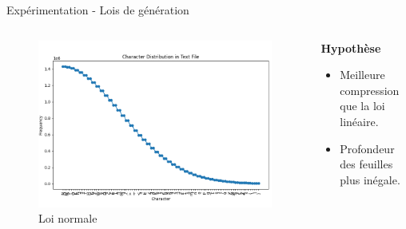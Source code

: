 \documentclass{beamer}
\begin{document}
\begin{frame}{Expérimentation - Lois de génération}
    \begin{columns}[T]
        \begin{column}{0.6\textwidth}
            \begin{figure}
                \centering
                \includegraphics[width=\textwidth]{../assets/normal.png}
                \caption{Loi normale}
            \end{figure}
        \end{column}
        \begin{column}{0.5\textwidth}
            \vspace{10pt}
            \textbf{Hypothèse} \\
            \vspace{10pt}
            \begin{itemize}
                \item Meilleure compression que la loi linéaire.
                \item Profondeur des feuilles plus inégale.
            \end{itemize}
        \end{column}
    \end{columns}
\end{frame}
\end{document}
